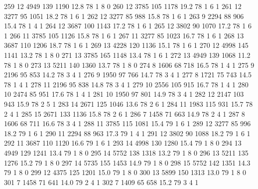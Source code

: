 \documentclass{article}
\begin{document}
\begin{Schunk}
\begin{Soutput}
259      12  4949 139 1190 12.8  78      1       8        0
260      12  3785 105 1178 19.2  78      1       6        1
261      12  3277  95 1051 18.2  78      1       6        1
262      12  3277  85  988 15.8  78      1       6        1
263       9  2294  88  906 15.4  78      1       4        1
264      12  3687 100 1143 17.2  78      1       6        1
265      12  3802  90 1070 17.2  78      1       6        1
266      11  3785 105 1126 15.8  78      1       6        1
267      11  3277  85 1023 16.7  78      1       6        1
268      13  3687 110 1206 18.7  78      1       6        1
269      13  4228 120 1136 15.1  78      1       6        1
270      12  4998 145 1141 13.2  78      1       8        0
271      13  3785 165 1148 13.4  78      1       6        1
272      13  4949 139 1068 11.2  78      1       8        0
273      13  5211 140 1360 13.7  78      1       8        0
274       8  1606  68  718 16.5  78      1       4        1
275       9  2196  95  853 14.2  78      3       4        1
276       9  1950  97  766 14.7  78      3       4        1
277       8  1721  75  743 14.5  78      1       4        1
278      11  2196  95  838 14.8  78      3       4        1
279      10  2556 105  915 16.7  78      1       4        1
280      10  2474  85  951 17.6  78      1       4        1
281      10  1950  97  801 14.9  78      3       4        1
282      12  2147 103  943 15.9  78      2       5        1
283      14  2671 125 1046 13.6  78      2       6        1
284      11  1983 115  931 15.7  78      2       4        1
285      15  2671 133 1136 15.8  78      2       6        1
286       7  1458  71  663 14.9  78      2       4        1
287       8  1606  68  711 16.6  78      3       4        1
288      11  3785 115 1081 15.4  79      1       6        1
289      12  3277  85  996 18.2  79      1       6        1
290      11  2294  88  963 17.3  79      1       4        1
291      12  3802  90 1088 18.2  79      1       6        1
292      11  3687 110 1120 16.6  79      1       6        1
293      14  4998 130 1280 15.4  79      1       8        0
294      13  4949 129 1241 13.4  79      1       8        0
295      14  5752 138 1318 13.2  79      1       8        0
296      13  5211 135 1276 15.2  79      1       8        0
297      14  5735 155 1453 14.9  79      1       8        0
298      15  5752 142 1351 14.3  79      1       8        0
299      12  4375 125 1201 15.0  79      1       8        0
300      13  5899 150 1313 13.0  79      1       8        0
301       7  1458  71  641 14.0  79      2       4        1
302       7  1409  65  658 15.2  79      3       4        1

\end{Soutput}
\end{Schunk}
\end{document}
